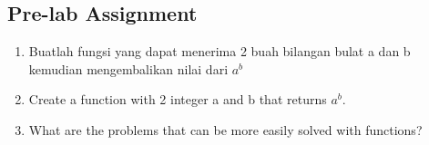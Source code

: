 \subsection{Pre-lab Assignment}
\begin{enumerate}
    \item Buatlah fungsi yang dapat menerima 2 buah bilangan
          bulat a dan b kemudian mengembalikan nilai dari $a^b$
    \item Create a function with 2 integer a and
          b that returns $a^b$.
    \item What are the problems that can be more easily solved with functions?
\end{enumerate}

